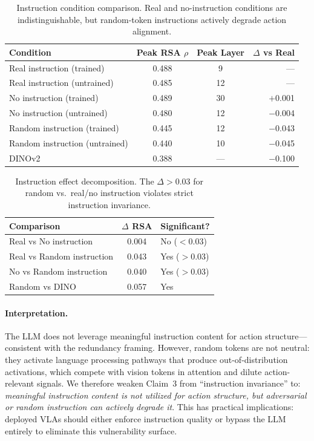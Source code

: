 \documentclass[letterpaper]{article}
\begin{document}
\begin{table}[t]
\centering
\caption{Instruction condition comparison. Real and no-instruction conditions are indistinguishable, but random-token instructions actively degrade action alignment.}
\label{tab:instruction}
\small
\begin{tabular}{lccr}
\toprule
\textbf{Condition} & \textbf{Peak RSA $\rho$} & \textbf{Peak Layer} & \textbf{$\Delta$ vs Real} \\
\midrule
Real instruction (trained) & 0.488 & 9  & --- \\
Real instruction (untrained) & 0.485 & 12 & --- \\
No instruction (trained) & 0.489 & 30 & $+$0.001 \\
No instruction (untrained) & 0.480 & 12 & $-$0.004 \\
Random instruction (trained) & 0.445 & 12 & $-$0.043 \\
Random instruction (untrained) & 0.440 & 10 & $-$0.045 \\
\midrule
DINOv2 & 0.388 & --- & $-$0.100 \\
\bottomrule
\end{tabular}
\end{table}

\begin{table}[t]
\centering
\caption{Instruction effect decomposition. The $\Delta>0.03$ for random vs.\ real/no instruction violates strict instruction invariance.}
\label{tab:inst_decomp}
\small
\begin{tabular}{lcl}
\toprule
\textbf{Comparison} & \textbf{$\Delta$ RSA} & \textbf{Significant?} \\
\midrule
Real vs No instruction & 0.004 & No ($< 0.03$) \\
Real vs Random instruction & 0.043 & Yes ($> 0.03$) \\
No vs Random instruction & 0.040 & Yes ($> 0.03$) \\
Random vs DINO & 0.057 & Yes \\
\bottomrule
\end{tabular}
\end{table}

\paragraph{Interpretation.}
The LLM does not leverage meaningful instruction content for action structure---consistent with the redundancy framing.
However, random tokens are not neutral: they activate language processing pathways that produce out-of-distribution activations, which compete with vision tokens in attention and dilute action-relevant signals.
We therefore weaken Claim~3 from ``instruction invariance'' to: \emph{meaningful instruction content is not utilized for action structure, but adversarial or random instruction can actively degrade it}.
This has practical implications: deployed VLAs should either enforce instruction quality or bypass the LLM entirely to eliminate this vulnerability surface.
\end{document}
